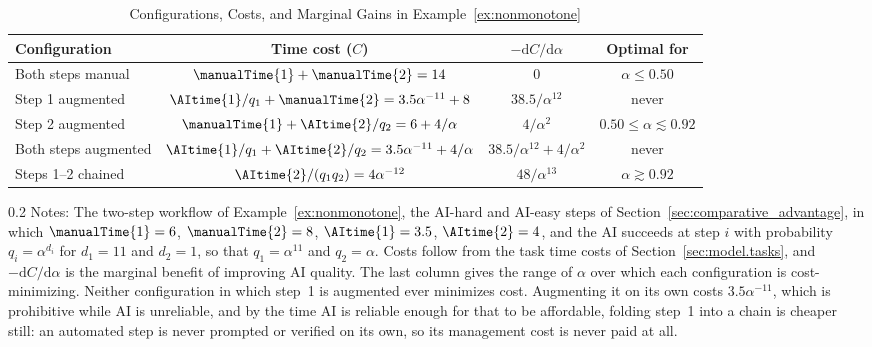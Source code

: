 \begin{table}[!t]
\centering
\caption{Configurations, Costs, and Marginal Gains in Example~\ref{ex:nonmonotone}}
\label{tab:nonmonotone_costs}
\singlespacing
\setlength{\tabcolsep}{10pt}
\begin{tabular}{lccc}
\toprule
Configuration & Time cost ($C$) & $-\mathrm{d}C/\mathrm{d}\alpha$ & Optimal for \\
\midrule
Both steps manual & $\manualTime{1} + \manualTime{2} = 14$ & $0$ & $\alpha \leq 0.50$ \\
\midrule
Step 1 augmented & $\AItime{1}/q_1 + \manualTime{2} = 3.5\alpha^{-11} + 8$ & $38.5/\alpha^{12}$ & never \\
\midrule
Step 2 augmented & $\manualTime{1} + \AItime{2}/q_2 = 6 + 4/\alpha$ & $4/\alpha^{2}$ & $0.50 \leq \alpha \lesssim 0.92$ \\
\midrule
Both steps augmented & $\AItime{1}/q_1 + \AItime{2}/q_2 = 3.5\alpha^{-11} + 4/\alpha$ & $38.5/\alpha^{12} + 4/\alpha^{2}$ & never \\
\midrule
Steps 1--2 chained & $\AItime{2}/(q_1 q_2) = 4\alpha^{-12}$ & $48/\alpha^{13}$ & $\alpha \gtrsim 0.92$ \\
\bottomrule
\end{tabular}
\par\vspace{\fignotesskip}
\begin{minipage}{1\linewidth}
\begin{spacing}{0.2}
{\fontsize{9.5pt}{10pt}\selectfont Notes: The two-step workflow of Example~\ref{ex:nonmonotone}, the AI-hard and AI-easy steps of Section~\ref{sec:comparative_advantage}, in which $\manualTime{1}=6$, $\manualTime{2}=8$, $\AItime{1}=3.5$, $\AItime{2}=4$, and the AI succeeds at step $i$ with probability $q_i = \alpha^{d_i}$ for $d_1 = 11$ and $d_2 = 1$, so that $q_1 = \alpha^{11}$ and $q_2 = \alpha$.
Costs follow from the task time costs of Section~\ref{sec:model.tasks}, and $-\mathrm{d}C/\mathrm{d}\alpha$ is the marginal benefit of improving AI quality.
The last column gives the range of $\alpha$ over which each configuration is cost-minimizing.
Neither configuration in which step~1 is augmented ever minimizes cost.
Augmenting it on its own costs $3.5\alpha^{-11}$, which is prohibitive while AI is unreliable, and by the time AI is reliable enough for that to be affordable, folding step~1 into a chain is cheaper still: an automated step is never prompted or verified on its own, so its management cost is never paid at all.}
\end{spacing}
\end{minipage}
\end{table}

